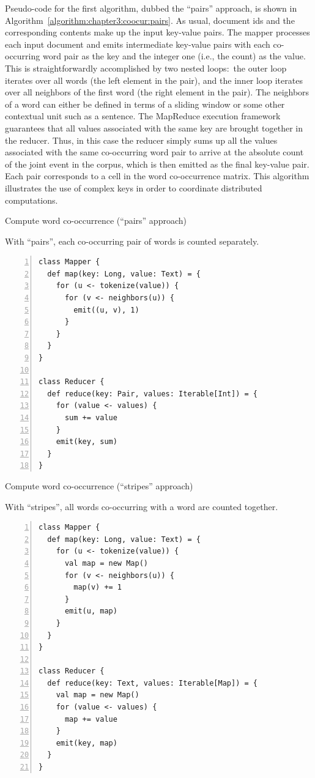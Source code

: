 \documentclass[11pt]{article}
\begin{document}
Pseudo-code for the first algorithm, dubbed the ``pairs'' approach, is
shown in Algorithm~\ref{algorithm:chapter3:coocur:pairs}.  As usual,
document ids and the corresponding contents make up the input
key-value pairs.  The mapper processes each input document and emits
intermediate key-value pairs with each co-occurring word pair as the
key and the integer one (i.e., the count) as the value.  This is
straightforwardly accomplished by two nested loops:\ the outer loop
iterates over all words (the left element in the pair), and the inner
loop iterates over all neighbors of the first word (the right element
in the pair).  The neighbors of a word can either be defined in terms
of a sliding window or some other contextual unit such as a sentence.
The MapReduce execution framework guarantees that all values
associated with the same key are brought together in the reducer.
Thus, in this case the reducer simply sums up all the values
associated with the same co-occurring word pair to arrive at the
absolute count of the joint event in the corpus, which is then emitted
as the final key-value pair. Each pair corresponds to a cell in the
word co-occurrence matrix.  This algorithm illustrates the use of
complex keys in order to coordinate distributed computations.

\begin{algorithm}[p]
\caption{Compute word co-occurrence (``pairs'' approach)}
\label{algorithm:chapter3:coocur:pairs}
With ``pairs'', each co-occurring pair of words is counted separately.
\begin{small}
\begin{Verbatim}[numbers=left, xleftmargin=7.5mm]
class Mapper {
  def map(key: Long, value: Text) = {
    for (u <- tokenize(value)) {
      for (v <- neighbors(u)) {
        emit((u, v), 1)
      }
    }
  }
}

class Reducer {
  def reduce(key: Pair, values: Iterable[Int]) = {
    for (value <- values) {
      sum += value
    }
    emit(key, sum)
  }
}
\end{Verbatim}
\end{small}
\end{algorithm}

\begin{algorithm}[p]
\caption{Compute word co-occurrence (``stripes'' approach)}
\label{algorithm:chapter3:coocur:stripes}
With ``stripes'', all words co-occurring with a word are counted
together.
\begin{small}
\begin{Verbatim}[numbers=left, xleftmargin=7.5mm]
class Mapper {
  def map(key: Long, value: Text) = {
    for (u <- tokenize(value)) {
      val map = new Map()
      for (v <- neighbors(u)) {
        map(v) += 1
      }
      emit(u, map)
    }
  }
}

class Reducer {
  def reduce(key: Text, values: Iterable[Map]) = {
    val map = new Map()
    for (value <- values) {
      map += value
    }
    emit(key, map)
  }
}
\end{Verbatim}
\end{small}
\end{algorithm}
\end{document}
